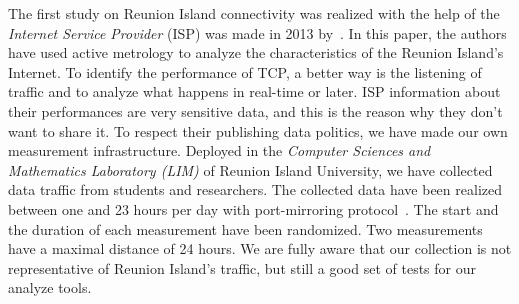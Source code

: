 \documentclass[10pt, conference, a4paper, twocolumns]{IEEEtran}
\begin{document}
The first study on Reunion Island connectivity was realized with the help of the \emph{Internet Service Provider} (ISP) was made in 2013 by~\cite{Vergoz2013}. In this paper, the authors have used active metrology to analyze the characteristics of the Reunion Island's Internet. To identify the performance of TCP, a better way is the listening of traffic and to analyze what happens in real-time or later. ISP information about their performances are very sensitive data, and this is the reason why they don't want to share it. 
To respect their publishing data politics, we have made our own measurement infrastructure. Deployed in the \emph{Computer Sciences and Mathematics Laboratory (LIM)} of Reunion Island University, we have collected data traffic from students and researchers. 
The collected data have been realized between one and 23 hours per day with port-mirroring protocol~\cite{Foschiano2015}.
The start and the duration of each measurement have been randomized. Two measurements have a maximal distance of 24 hours. We are fully aware that our collection is not representative of Reunion Island's traffic, but still a good set of tests for our analyze tools.%

\end{document}
